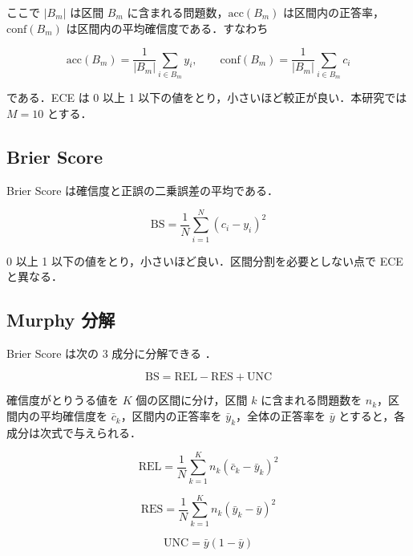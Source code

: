 ここで $|B_m|$ は区間 $B_m$ に含まれる問題数，$\mathrm{acc}(B_m)$ は区間内の正答率，$\mathrm{conf}(B_m)$ は区間内の平均確信度である．すなわち

\begin{equation}
\mathrm{acc}(B_m) = \frac{1}{|B_m|}\sum_{i \in B_m} y_i, \qquad
\mathrm{conf}(B_m) = \frac{1}{|B_m|}\sum_{i \in B_m} c_i
\end{equation}

である．ECE は 0 以上 1 以下の値をとり，小さいほど較正が良い．本研究では$M = 10$ とする．

\subsection{Brier Score}

Brier Score は確信度と正誤の二乗誤差の平均である．

\begin{equation}
\mathrm{BS} = \frac{1}{N} \sum_{i=1}^{N} (c_i - y_i)^2
\end{equation}

0 以上 1 以下の値をとり，小さいほど良い．区間分割を必要としない点で ECE と異なる．

\subsection{Murphy 分解}

Brier Score は次の 3 成分に分解できる \cite{murphy1973partition}．

\begin{equation}
\mathrm{BS} = \mathrm{REL} - \mathrm{RES} + \mathrm{UNC}
\end{equation}

確信度がとりうる値を $K$ 個の区間に分け，区間 $k$ に含まれる問題数を $n_k$，区間内の平均確信度を $\bar{c}_k$，区間内の正答率を $\bar{y}_k$，全体の正答率を $\bar{y}$ とすると，各成分は次式で与えられる．

\begin{equation}
\mathrm{REL} = \frac{1}{N} \sum_{k=1}^{K} n_k (\bar{c}_k - \bar{y}_k)^2
\end{equation}

\begin{equation}
\mathrm{RES} = \frac{1}{N} \sum_{k=1}^{K} n_k (\bar{y}_k - \bar{y})^2
\end{equation}

\begin{equation}
\mathrm{UNC} = \bar{y}(1 - \bar{y})
\end{equation}

